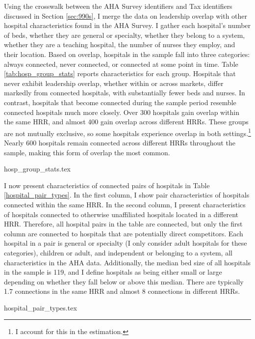 \documentclass[12pt]{article}
\begin{document}
    Using the crosswalk between the AHA Survey identifiers and Tax identifiers discussed in Section \ref{sec:990s}, I merge the data on leadership overlap with other hospital characteristics found in the AHA Survey. I gather each hospital's number of beds, whether they are general or specialty, whether they belong to a system, whether they are a teaching hospital, the number of nurses they employ, and their location. Based on overlap, hospitals in the sample fall into three categories: always connected, never connected, or connected at some point in time. Table \ref{tab:hosp_group_stats} reports characteristics for each group. Hospitals that never exhibit leadership overlap, whether within or across markets, differ markedly from connected hospitals, with substantially fewer beds and nurses. In contrast, hospitals that become connected during the sample period resemble connected hospitals much more closely. Over 300 hospitals gain overlap within the same HRR, and almost 400 gain overlap across different HRRs. These groups are not mutually exclusive, so some hospitals experience overlap in both settings.\footnote{I account for this in the estimation.} Nearly 600 hospitals remain connected across different HRRs throughout the sample, making this form of overlap the most common.

    {hosp_group_stats.tex}

    I now present characteristics of connected pairs of hospitals in Table \ref{hospital_pair_types}. In the first column, I show pair characteristics of hospitals connected within the same HRR. In the second column, I present characteristics of hospitals connected to otherwise unaffiliated hospitals located in a different HRR. Therefore, all hospital pairs in the table are connected, but only the first column are connected to hospitals that are potentially direct competitors. Each hospital in a pair is general or specialty (I only consider adult hospitals for these categories), children or adult, and independent or belonging to a system, all characteristics in the AHA data. Additionally, the median bed size of all hospitals in the sample is 119, and I define hospitals as being either small or large depending on whether they fall below or above this median. There are typically 1.7 connections in the same HRR and almost 8 connections in different HRRs. 

    {hospital_pair_types.tex}
\end{document}
